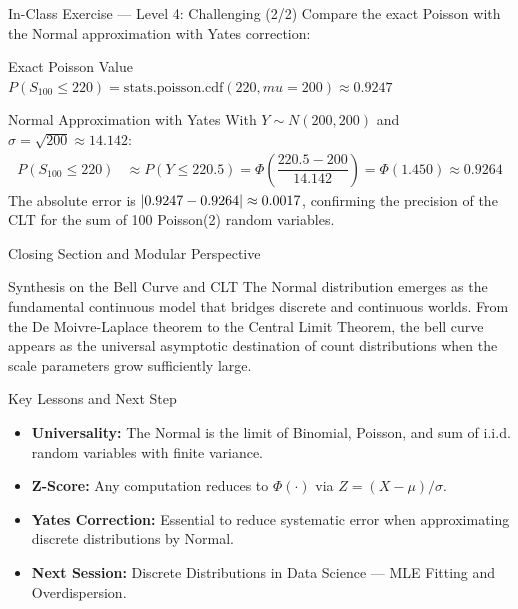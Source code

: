\documentclass[aspectratio=169,xcolor={dvipsnames,table}]{beamer}
\begin{document}
\begin{frame}{In-Class Exercise --- Level 4: Challenging (2/2)}
	\vspace{-0.05cm}
	\scriptsize
	Compare the exact Poisson with the Normal approximation with Yates correction: \pause
	\begin{block}{Exact Poisson Value}
		\scriptsize
		$P(S_{100} \le 220) = \text{stats.poisson.cdf}(220, mu=200) \approx 0.9247$
	\end{block}
	\vspace{0.05cm}
	\pause
	\begin{alertblock}{Normal Approximation with Yates}
		\scriptsize
		With $Y \sim N(200, 200)$ and $\sigma = \sqrt{200} \approx 14.142$:
		\begin{align*}
			P(S_{100} \le 220) &\approx P\left(Y \le 220.5\right) = \Phi\left(\dfrac{220.5 - 200}{14.142}\right) = \Phi(1.450) \approx 0.9264
		\end{align*}
		The absolute error is $\left|0.9247 - 0.9264\right| \approx 0.0017$, confirming the precision of the CLT for the sum of 100 Poisson(2) random variables. \qedhere
	\end{alertblock}
\end{frame}

\begin{frame}{Closing Section and Modular Perspective}
	\vspace{-0.15cm}
	\begin{block}{Synthesis on the Bell Curve and CLT}
		\scriptsize
		The Normal distribution emerges as the fundamental continuous model that bridges discrete and continuous worlds. From the De Moivre-Laplace theorem to the Central Limit Theorem, the bell curve appears as the universal asymptotic destination of count distributions when the scale parameters grow sufficiently large.
	\end{block}
	\vspace{0.05cm}
	\pause
	\begin{alertblock}{Key Lessons and Next Step}
		\begin{itemize}\itemsep=0.05cm
			\item \textbf{Universality:} The Normal is the limit of Binomial, Poisson, and sum of i.i.d. random variables with finite variance.
			\item \textbf{Z-Score:} Any computation reduces to $\Phi(\cdot)$ via $Z = (X - \mu)/\sigma$.
			\item \textbf{Yates Correction:} Essential to reduce systematic error when approximating discrete distributions by Normal.
			\item \textbf{Next Session:} \textcolor{TecRojo}{Discrete Distributions in Data Science --- MLE Fitting and Overdispersion}.
		\end{itemize}
	\end{alertblock}
\end{frame}
\end{document}
